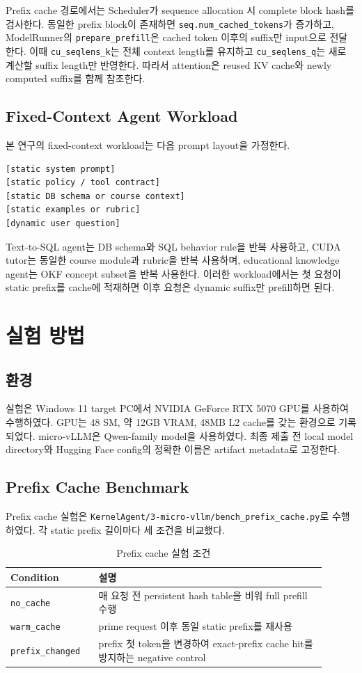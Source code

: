 \documentclass{kcc}
\begin{document}
Prefix cache 경로에서는 Scheduler가 sequence allocation 시 complete block hash를 검사한다. 동일한 prefix block이 존재하면 \texttt{seq.num\_cached\_tokens}가 증가하고, ModelRunner의 \texttt{prepare\_prefill}은 cached token 이후의 suffix만 input으로 전달한다. 이때 \texttt{cu\_seqlens\_k}는 전체 context length를 유지하고 \texttt{cu\_seqlens\_q}는 새로 계산할 suffix length만 반영한다. 따라서 attention은 reused KV cache와 newly computed suffix를 함께 참조한다.

\subsection{Fixed-Context Agent Workload}
본 연구의 fixed-context workload는 다음 prompt layout을 가정한다.
\begin{verbatim}
[static system prompt]
[static policy / tool contract]
[static DB schema or course context]
[static examples or rubric]
[dynamic user question]
\end{verbatim}
Text-to-SQL agent는 DB schema와 SQL behavior rule을 반복 사용하고, CUDA tutor는 동일한 course module과 rubric을 반복 사용하며, educational knowledge agent는 OKF concept subset을 반복 사용한다. 이러한 workload에서는 첫 요청이 static prefix를 cache에 적재하면 이후 요청은 dynamic suffix만 prefill하면 된다.

\section{실험 방법}
\subsection{환경}
실험은 Windows 11 target PC에서 NVIDIA GeForce RTX 5070 GPU를 사용하여 수행하였다. GPU는 48 SM, 약 12GB VRAM, 48MB L2 cache를 갖는 환경으로 기록되었다. micro-vLLM은 Qwen-family model을 사용하였다. 최종 제출 전 local model directory와 Hugging Face config의 정확한 이름은 artifact metadata로 고정한다.

\subsection{Prefix Cache Benchmark}
Prefix cache 실험은 \texttt{KernelAgent/3-micro-vllm/bench\_prefix\_cache.py}로 수행하였다. 각 static prefix 길이마다 세 조건을 비교했다.

\begin{table}[h]
\centering
\scriptsize
\setlength{\tabcolsep}{2pt}
\begin{tabular}{|p{0.25\linewidth}|p{0.65\linewidth}|}
\hline
\textbf{Condition} & \textbf{설명} \\ \hline
\texttt{no\_cache} & 매 요청 전 persistent hash table을 비워 full prefill 수행 \\ \hline
\texttt{warm\_cache} & prime request 이후 동일 static prefix를 재사용 \\ \hline
\texttt{prefix\_changed} & prefix 첫 token을 변경하여 exact-prefix cache hit를 방지하는 negative control \\ \hline
\end{tabular}
\caption{Prefix cache 실험 조건}
\end{table}
\end{document}
